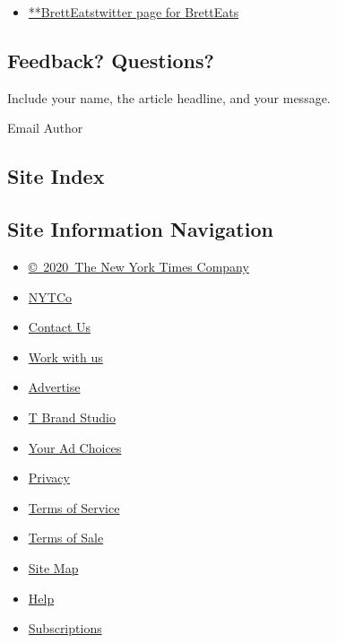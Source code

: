 \begin{itemize}
\tightlist
\item
  \href{https://twitter.com/BrettEats}{**BrettEatstwitter page for
  BrettEats}
\end{itemize}

\hypertarget{feedback-questions}{%
\subsection{Feedback? Questions?}\label{feedback-questions}}

Include your name, the article headline, and your message.

Email Author

\hypertarget{site-index}{%
\subsection{Site Index}\label{site-index}}

\hypertarget{site-information-navigation}{%
\subsection{Site Information
Navigation}\label{site-information-navigation}}

\begin{itemize}
\tightlist
\item
  \href{https://help.nytimes3xbfgragh.onion/hc/en-us/articles/115014792127-Copyright-notice}{©~2020~The
  New York Times Company}
\end{itemize}

\begin{itemize}
\tightlist
\item
  \href{https://www.nytco.com/}{NYTCo}
\item
  \href{https://help.nytimes3xbfgragh.onion/hc/en-us/articles/115015385887-Contact-Us}{Contact
  Us}
\item
  \href{https://www.nytco.com/careers/}{Work with us}
\item
  \href{https://nytmediakit.com/}{Advertise}
\item
  \href{http://www.tbrandstudio.com/}{T Brand Studio}
\item
  \href{https://www.nytimes3xbfgragh.onion/privacy/cookie-policy\#how-do-i-manage-trackers}{Your
  Ad Choices}
\item
  \href{https://www.nytimes3xbfgragh.onion/privacy}{Privacy}
\item
  \href{https://help.nytimes3xbfgragh.onion/hc/en-us/articles/115014893428-Terms-of-service}{Terms
  of Service}
\item
  \href{https://help.nytimes3xbfgragh.onion/hc/en-us/articles/115014893968-Terms-of-sale}{Terms
  of Sale}
\item
  \href{https://spiderbites.nytimes3xbfgragh.onion}{Site Map}
\item
  \href{https://help.nytimes3xbfgragh.onion/hc/en-us}{Help}
\item
  \href{https://www.nytimes3xbfgragh.onion/subscription?campaignId=37WXW}{Subscriptions}
\end{itemize}
